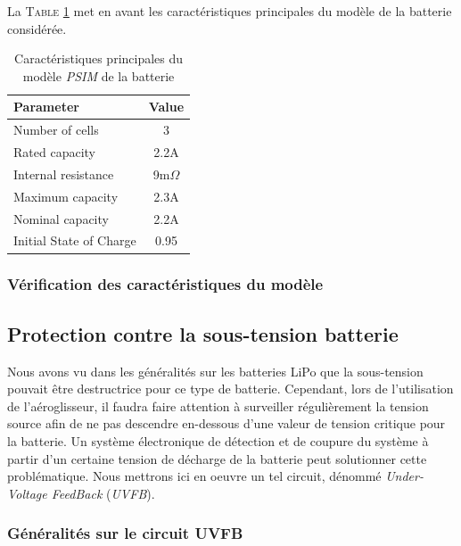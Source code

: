 				La \textsc{Table \ref{carac_lipo_psim}}  met en avant les caractéristiques principales du modèle de la batterie considérée.
			
				\begin{table}[h]
					\begin{center}
						\begin{tabular}{l c}
							Parameter				& Value			\\
							\hline
							Number of cells 		& 3 			\\
							Rated capacity			& 2.2A 			\\
							Internal resistance		& 9m$\Omega$	\\
							Maximum capacity		& 2.3A			\\
							Nominal capacity		& 2.2A			\\
							Initial State of Charge	& 0.95			\\
						\end{tabular}
					\end{center}
					\caption{Caractéristiques principales du modèle \textit{PSIM} de la batterie}
					\label{carac_lipo_psim}
				\end{table}
			
				\subsubsection{Vérification des caractéristiques du modèle}
			
			\subsection{Protection contre la sous-tension batterie}
			
			Nous avons vu dans les généralités sur les batteries LiPo que la sous-tension pouvait être destructrice pour ce type de batterie. Cependant, lors de l'utilisation de l'aéroglisseur, il faudra faire attention à surveiller régulièrement la tension source afin de ne pas descendre en-dessous d'une valeur de tension critique pour la batterie. Un système électronique de détection et de coupure du système à partir d'un certaine tension de décharge de la batterie peut solutionner cette problématique. Nous mettrons ici en oeuvre un tel circuit, dénommé \textit{Under-Voltage FeedBack} (\textit{UVFB}).
			
				\subsubsection{Généralités sur le circuit UVFB}
				
